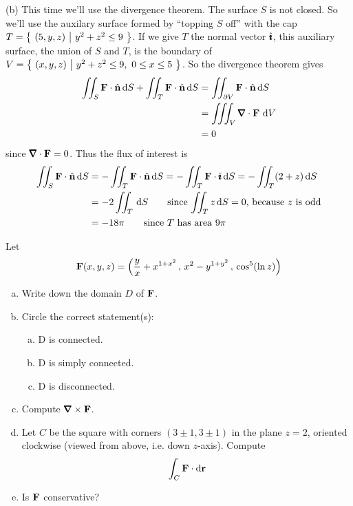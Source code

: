 \begin{solution}
\noindent (b)
This time we'll use the divergence theorem. The surface $S$ is not closed.
So we'll use the auxilary surface formed by ``topping $S$ off''
with the cap $T=\big\{ \ (5,y,z)\ \big|\ y^2+z^2\le 9\ \big\}$. If we give $T$ the normal vector $\hat{\pmb{\imath}}$, this auxiliary surface, the union of $S$ and $T$, is the boundary of 
$V=\big\{ \ (x,y,z)\ \big|\ y^2+z^2\le 9,\ 0\le x\le 5\ \big\}$. So the divergence theorem gives
\begin{align*}
\dblInt_S  \vF\cdot\hn\,\dee{S}
+\dblInt_T \vF\cdot\hn\,\dee{S} 
&= \dblInt_{\partial V} \vF\cdot\hn\,\dee{S} \\
&=\tripInt_V \vnabla\cdot \vF\ \dee{V} \\
&=0
\end{align*}
since $\vnabla\cdot \vF = 0$. Thus the flux of interest is
\begin{align*}
\iint_S  \mathbf{F}\cdot\hat{\mathbf{n}}\,\mathrm{d}S
&=-\iint_T \mathbf{F}\cdot\hat{\mathbf{n}}\,\mathrm{d}S 
=-\iint_T \mathbf{F}\cdot\hat{\pmb{\imath}}\,\mathrm{d}S 
=-\iint_T (2+z)\,\mathrm{d}S \\
&=-2\iint_T \,\mathrm{d}S 
   \qquad\text{since $\iint_T z\,\mathrm{d}S=0$, because $z$ is odd}\\
&= -18\pi
    \qquad\text{since $T$ has area $9\pi$}
\end{align*}
\end{solution}

\begin{question}[M317 2010D] %
Let
\begin{equation*}
\mathbf{F}(x, y, z) = \Big(\frac{y}{x} +x^{1+x^2}\,,\, x^2-y^{1+y^2}\,,\,
                       \cos^5(\ln z)\Big)
\end{equation*}
\begin{enumerate}[(a)]
\item
Write down the domain $D$ of $\mathbf{F}$.

\item
Circle the correct statement(s):
\begin{enumerate}[(a)]
\item D is connected.
\item D is simply connected.
\item D is disconnected.
\end{enumerate}

\item 
Compute $\vnabla\times\vF$.

\item 
Let $C$ be the square with corners $(3 \pm 1, 3 \pm 1)$ in the plane 
$z = 2$, oriented clockwise (viewed from above, i.e. down $z$-axis). 
Compute 
\begin{equation*}
\int_C \mathbf{F} \cdot \mathrm{d}\mathbf{r}
\end{equation*}

\item
Is $\mathbf{F}$ conservative?

\end{enumerate}
\end{question}

